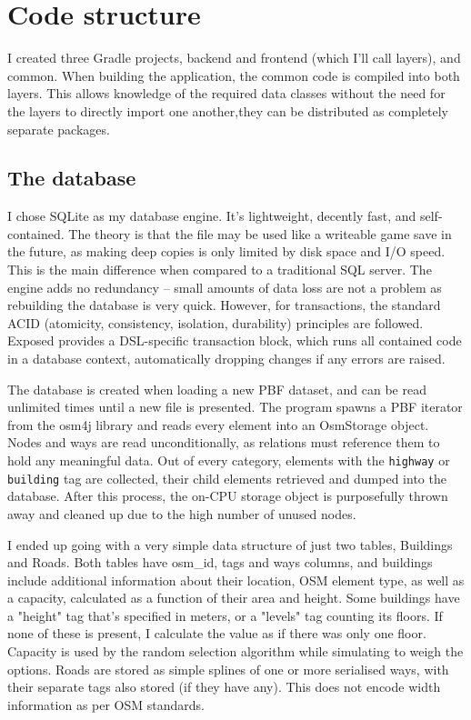 \chapter{Code structure}

I created three Gradle projects, backend and frontend (which I'll call layers), and common. When building the application, the common code is compiled into both layers. This allows knowledge of the required data classes without the need for the layers to directly import one another,they can be distributed as completely separate packages. 

\section{The database}

I chose SQLite as my database engine. It's lightweight, decently fast, and self-contained. The theory is that the file may be used like a writeable game save in the future, as making deep copies is only limited by disk space and I/O speed. This is the main difference when compared to a traditional SQL server. The engine adds no redundancy -- small amounts of data loss are not a problem as rebuilding the database is very quick. However, for transactions, the standard ACID (atomicity, consistency, isolation, durability) principles are followed. Exposed provides a DSL-specific transaction block, which runs all contained code in a database context, automatically dropping changes if any errors are raised.

\label{pbf-loading}
The database is created when loading a new PBF dataset, and can be read unlimited times until a new file is presented. The program spawns a PBF iterator from the osm4j library and reads every element into an OsmStorage object. Nodes and ways are read unconditionally, as relations must reference them to hold any meaningful data. Out of every category, elements with the \verb|highway| or \verb|building| tag are collected, their child elements retrieved and dumped into the database. After this process, the on-CPU storage object is purposefully thrown away and cleaned up due to the high number of unused nodes.

I ended up going with a very simple data structure of just two tables, Buildings and Roads. Both tables have osm\_id, tags and ways columns, and buildings include additional information about their location, OSM element type, as well as a capacity, calculated as a function of their area and height. Some buildings have a "height" tag that's specified in meters, or a "levels" tag counting its floors. If none of these is present, I calculate the value as if there was only one floor. Capacity is used by the random selection algorithm while simulating to weigh the options. Roads are stored as simple splines of one or more serialised ways, with their separate tags also stored (if they have any). This does not encode width information as per OSM standards.

